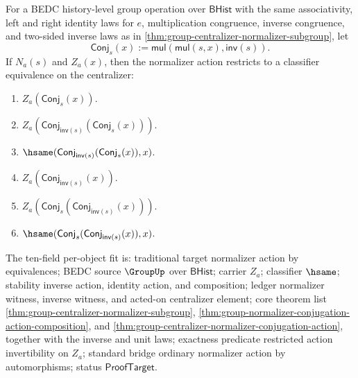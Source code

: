 \begin{theorem}
\label{thm:group-centralizer-normalizer-action-inverse}
For a BEDC history-level group operation over $\mathsf{BHist}$ with the same
associativity, left and right identity laws for $e$, multiplication
congruence, inverse congruence, and two-sided inverse laws as in
\autoref{thm:group-centralizer-normalizer-subgroup}, let
$$
\mathsf{Conj}_s(x):=
\mathsf{mul}(\mathsf{mul}(s,x),\mathsf{inv}(s)).
$$
If $N_a(s)$ and $Z_a(x)$, then the normalizer action restricts to a classifier
equivalence on the centralizer:
\begin{enumerate}
\item $Z_a(\mathsf{Conj}_s(x))$.
\item $Z_a(\mathsf{Conj}_{\mathsf{inv}(s)}(\mathsf{Conj}_s(x)))$.
\item $\hsame(\mathsf{Conj}_{\mathsf{inv}(s)}(\mathsf{Conj}_s(x)),x)$.
\item $Z_a(\mathsf{Conj}_{\mathsf{inv}(s)}(x))$.
\item $Z_a(\mathsf{Conj}_s(\mathsf{Conj}_{\mathsf{inv}(s)}(x)))$.
\item $\hsame(\mathsf{Conj}_s(\mathsf{Conj}_{\mathsf{inv}(s)}(x)),x)$.
\end{enumerate}
The ten-field per-object fit is: traditional target normalizer action by
equivalences; BEDC source $\GroupUp$ over $\mathsf{BHist}$; carrier $Z_a$;
classifier $\hsame$; stability inverse action, identity action, and
composition; ledger normalizer witness, inverse witness, and acted-on
centralizer element; core theorem list
\autoref{thm:group-centralizer-normalizer-subgroup},
\autoref{thm:group-normalizer-conjugation-action-composition}, and
\autoref{thm:group-centralizer-normalizer-conjugation-action}, together with
the inverse and unit laws; exactness predicate restricted action invertibility
on $Z_a$; standard bridge ordinary normalizer action by automorphisms; status
$\mathsf{ProofTarget}$.
\end{theorem}
